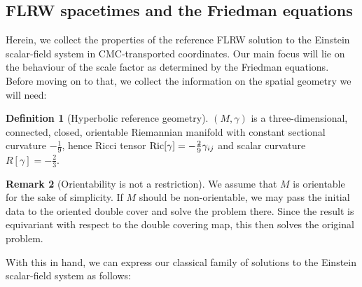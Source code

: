 \documentclass[11pt,leqno,textwidth=10cm]{amsart}
\numberwithin{equation}{section}
\theoremstyle{definition}
\newtheorem{definition}{Definition}[section]
\newtheorem{remark}[definition]{Remark}
\theoremstyle{plain}
\newcommand{\1}{\mathbbm{1}}
\newcommand{\Ric}{\text{\normalfont{Ric}}}
\newcommand{\change}[1]{\color{black}#1\color{black}}
\begin{document}
\subsection{FLRW spacetimes and the Friedman equations}\label{subsec:FLRW}

Herein, we collect the properties of the reference FLRW solution to the Einstein scalar-field system in CMC-transported coordinates. Our main focus will lie on the behaviour of the scale factor as determined by the Friedman equations. Before moving on to that, we collect the information on the spatial geometry we will need:

\begin{definition}[Hyperbolic reference geometry]\label{def:spatial-mf}
$(M,\gamma)$ is a three-dimensional, connected, closed, orientable Riemannian manifold with constant sectional curvature $-\frac19$, hence Ricci tensor $\Ric[\gamma]=-\frac29\gamma_{ij}$ and scalar curvature $R[\gamma]=-\frac23$. 
\end{definition}
\change{\begin{remark}[Orientability is not a restriction]
We assume that $M$ is orientable for the sake of simplicity. If $M$ should be non-orientable, we may pass the initial data to the oriented double cover and solve the problem there. Since the result is equivariant with respect to the double covering map, this then solves the original problem.
\end{remark}}

With this in hand, we can express our classical \change{family of solutions }to the Einstein scalar-field system as follows:
\end{document}
